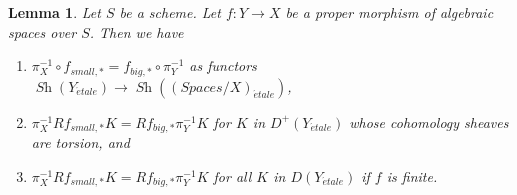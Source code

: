 \documentclass{stacks-project}
\theoremstyle{plain}
\newtheorem{lemma}[subsection]{Lemma}
\theoremstyle{definition}
\theoremstyle{remark}
\numberwithin{equation}{subsection}
\def\Sh{\mathop{\mathit{Sh}}\nolimits}
\def\etale{{\acute{e}tale}}
\begin{document}
\begin{lemma}
\label{lemma-compare-higher-direct-image-proper}
Let $S$ be a scheme.
Let $f : Y \to X$ be a proper morphism of algebraic spaces over $S$.
Then we have
\begin{enumerate}
\item $\pi_X^{-1} \circ f_{small, *} = f_{big, *} \circ \pi_Y^{-1}$
as functors $\Sh(Y_\etale) \to \Sh((\textit{Spaces}/X)_\etale)$,
\item $\pi_X^{-1}Rf_{small, *}K = Rf_{big, *}\pi_Y^{-1}K$
for $K$ in $D^+(Y_\etale)$ whose cohomology sheaves are torsion, and
\item $\pi_X^{-1}Rf_{small, *}K = Rf_{big, *}\pi_Y^{-1}K$
for all $K$ in $D(Y_\etale)$ if $f$ is finite.
\end{enumerate}
\end{lemma}
\end{document}
